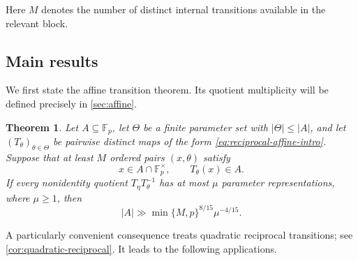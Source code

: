 \documentclass[11pt,reqno]{amsart}
\numberwithin{equation}{section}
\newtheorem{theorem}{Theorem}[section]
\theoremstyle{definition}
\theoremstyle{remark}
\newcommand{\F}{\mathbb F}
\begin{document}
Here $M$ denotes the number of distinct internal transitions available in the relevant block.

\subsection{Main results}

We first state the affine transition theorem.  Its quotient multiplicity will be defined precisely in \cref{sec:affine}.

\begin{theorem}\label{thm:affine-intro}
Let $A\subseteq\F_p$, let $\Theta$ be a finite parameter set with $|\Theta|\le |A|$, and let $(T_\theta)_{\theta\in\Theta}$ be pairwise distinct maps of the form \eqref{eq:reciprocal-affine-intro}.  Suppose that at least $M$ ordered pairs $(x,\theta)$ satisfy
\[
  x\in A\cap\F_p^\times,
  \qquad
  T_\theta(x)\in A.
\]
If every nonidentity quotient $T_\eta T_\theta^{-1}$ has at most $\mu$ parameter representations, where $\mu\ge1$, then
\begin{equation}\label{eq:affine-intro-bound}
  |A|\gg \min\{M,p\}^{8/15}\mu^{-4/15}.
\end{equation}
\end{theorem}

A particularly convenient consequence treats quadratic reciprocal transitions; see \cref{cor:quadratic-reciprocal}.  It leads to the following applications.
\end{document}

